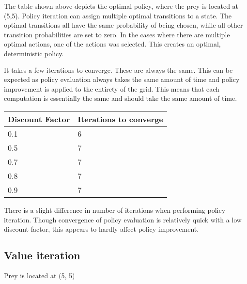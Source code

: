 \documentclass{article}
\begin{document}
The table shown above depicts the optimal policy, where the prey is located at (5,5). Policy iteration can assign multiple optimal transitions to a state. The optimal transitions all have the same probability of being chosen, while all other transition probabilities are set to zero. In the cases where there are multiple optimal actions, one of the actions was selected. This creates an optimal, deterministic policy.



It takes a few iterations to converge. These are always the same. This can be expected as policy evaluation always takes the same amount of time and policy improvement is applied to the entirety of the grid. This means that each computation is essentially the same and should take the same amount of time.

\begin{center}
	\begin{tabular}{ l || l }
		Discount Factor & Iterations to converge \\ 
		\hline
		0.1 & 6 \\
		0.5 & 7 \\
		0.7 & 7 \\
		0.8 & 7 \\	
		0.9 & 7 \\	
	\end{tabular}
\end{center}
There is a slight difference in number of iterations when performing policy iteration. Though convergence of policy evaluation is relatively quick with a low discount factor, this appears to hardly affect policy improvement.

\subsection*{Value iteration}


Prey is located at (5, 5)
\end{document}
